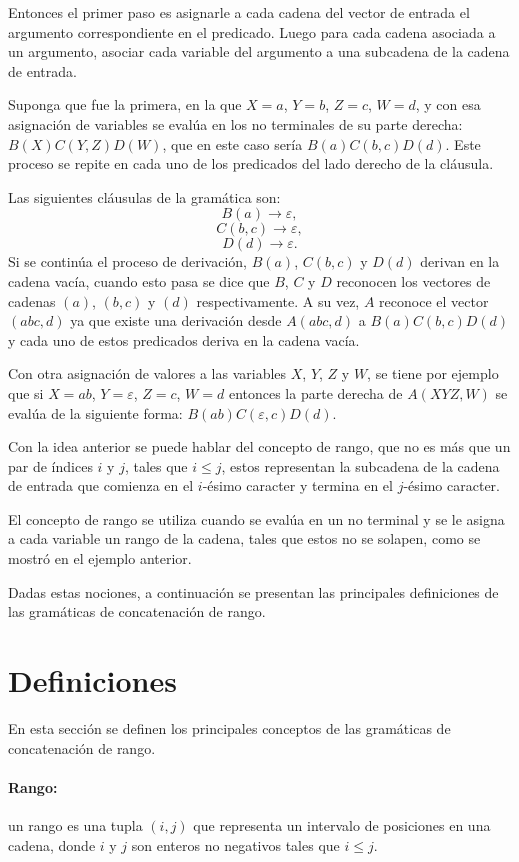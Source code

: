 Entonces el primer paso es asignarle a cada cadena del vector de entrada el argumento correspondiente 
en el predicado. Luego para cada cadena asociada a un argumento, asociar cada variable del argumento
a una subcadena de la cadena de entrada.

Suponga que fue la primera, en la que $X=a$, $Y = b$, $Z = c$, $W=d$, y con esa asignación de variables
se evalúa en los no terminales de su parte derecha: $B(X)C(Y,Z)D(W)$, que en este caso sería $B(a)C(b,c)D(d)$.
Este proceso se repite en cada uno de los predicados del lado derecho de la cláusula.

Las siguientes cláusulas de la gramática son:
$$B(a)\to \varepsilon,$$
$$C(b,c)\to \varepsilon,$$
$$D(d)\to \varepsilon.$$
Si se continúa el proceso de derivación, $B(a)$, $C(b,c)$ y $D(d)$ derivan en la cadena vacía, cuando esto pasa se dice
que $B$, $C$ y $D$ reconocen los vectores de cadenas $(a)$, $(b,c)$ y $(d)$ respectivamente. A su vez, $A$ reconoce el
vector $(abc,d)$ ya que existe una derivación desde $A(abc,d)$ a $B(a)C(b,c)D(d)$ y cada uno de estos predicados deriva en la cadena vacía. 

Con otra asignación de valores a las variables $X$, $Y$, $Z$ y $W$, se tiene por ejemplo que si $X=ab$, $Y = \varepsilon$, $Z=c$, $W=d$
entonces la parte derecha de $A(XYZ,W)$ se evalúa de la siguiente forma: $B(ab)C(\varepsilon,c)D(d)$.

Con la idea anterior se puede hablar del concepto de rango, que no es más que un par de índices $i$ y $j$, tales que $i\leq j$, estos
representan la subcadena de la cadena de entrada que comienza en el $i$-ésimo caracter y termina en el $j$-ésimo caracter.

El concepto de rango se utiliza cuando se evalúa en un no terminal y se le asigna a cada variable un rango de la cadena, tales
que estos no se solapen, como se mostró en el ejemplo anterior.

Dadas estas nociones, a continuación se presentan las principales definiciones de las gramáticas de concatenación de rango.

\section{Definiciones}

En esta sección se definen los principales conceptos de las gramáticas de concatenación de rango.

\paragraph{Rango:} un rango es una tupla $(i, j)$ que representa un intervalo de posiciones en una cadena, donde $i$ y $j$ son enteros no negativos tales que $i \leq j$.

